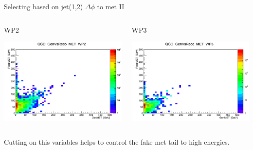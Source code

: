 \documentclass[8pt]{beamer}
\begin{document}
\begin{frame}{Selecting based on jet(1,2) $\Delta\phi$ to met II}
 
\begin{columns}

\begin{block}{WP2}
 
\centering
\includegraphics[width=\linewidth]{img/QCD_GenVsReco_MET_WP2.png} 
 
\end{block}

\begin{block}{WP3}

\centering
\includegraphics[width=\linewidth]{img/QCD_GenVsReco_MET_WP3.png} 
 
\end{block}

\end{columns}

Cutting on this variables helps to control the fake met tail to high energies.

\end{frame}
\end{document}
